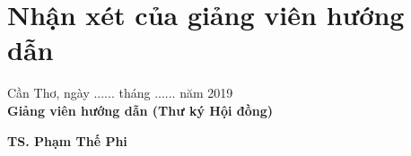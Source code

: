 \chapter*{\centering Nhận xét của giảng viên hướng dẫn}
\vspace{6mm}
\noindent
\begin{flushright}
Cần Thơ, ngày ...... tháng ...... năm 2019 \\
\textbf{Giảng viên hướng dẫn (Thư ký Hội đồng)}\\
\end{flushright}
\vspace{12mm}
\begin{flushright}
\textbf{TS. Phạm Thế Phi}
\end{flushright} 